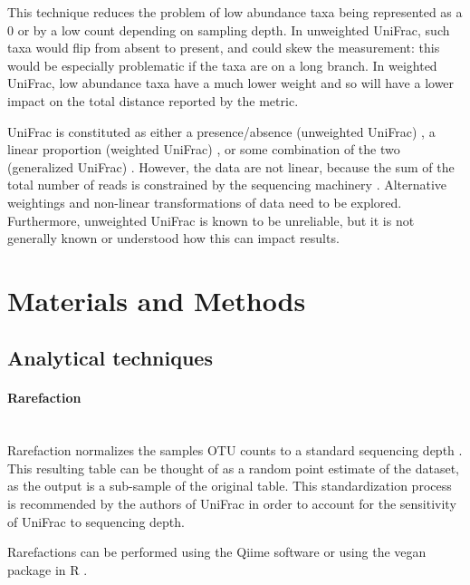 \documentclass[10pt,letterpaper]{article}
\begin{document}
This technique reduces the problem of low abundance taxa being represented as a 0 or by a low count depending on sampling depth. In unweighted UniFrac, such taxa would flip from absent to present, and could skew the measurement: this would be especially problematic if the taxa are on a long branch. In weighted UniFrac, low abundance taxa have a much lower weight and so will have a lower impact on the total distance reported by the metric.

UniFrac is constituted as either a presence/absence (unweighted UniFrac) \cite{lozupone2005unifrac}, a linear proportion (weighted UniFrac) \cite{lozupone2007quantitative}, or some combination of the two (generalized UniFrac) \cite{chen2012associating}. However, the data are not linear, because the sum of the total number of reads is constrained by the sequencing machinery \cite{friedman2012inferring} \cite{fernandes2013anova} \cite{fernandes2014unifying} \cite{lovell2015proportionality}. Alternative weightings and non-linear transformations of data need to be explored. Furthermore, unweighted UniFrac is known to be unreliable, but it is not generally known or understood how this can impact results.

\section*{Materials and Methods}

\subsection{Analytical techniques}

\paragraph{Rarefaction}\mbox{}\\
Rarefaction normalizes the samples OTU counts to a standard sequencing depth \cite{simberloff1978use}. This resulting table can be thought of as a random point estimate of the dataset, as the output is a sub-sample of the original table. This standardization process is recommended by the authors of UniFrac \cite{de2011evaluation} in order to account for the sensitivity of UniFrac to sequencing depth.

Rarefactions can be performed using the Qiime software \cite{caporaso2010qiime} or using the vegan package in R \cite{oksanen2007vegan}.
\end{document}
